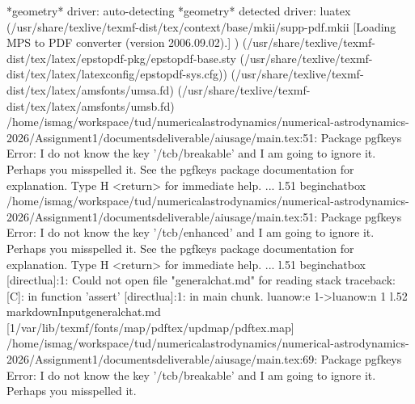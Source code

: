 {{*geometry* driver: auto-detecting
*geometry* detected driver: luatex
(/usr/share/texlive/texmf-dist/tex/context/base/mkii/supp-pdf.mkii
[Loading MPS to PDF converter (version 2006.09.02).]
) (/usr/share/texlive/texmf-dist/tex/latex/epstopdf-pkg/epstopdf-base.sty (/usr/share/texlive/texmf-dist/tex/latex/latexconfig/epstopdf-sys.cfg)) (/usr/share/texlive/texmf-dist/tex/latex/amsfonts/umsa.fd) (/usr/share/texlive/texmf-dist/tex/latex/amsfonts/umsb.fd)
/home/ismag/workspace/tud/numerical\markdownRendererUnderscore{}astrodynamics/numerical-astrodynamics-2026/Assignment1/documents\markdownRendererUnderscore{}deliverable/ai\markdownRendererUnderscore{}usage/main.tex:51: Package pgfkeys Error: I do not know the key '/tcb/breakable' and I am going to ignore it. Perhaps you misspelled it.
See the pgfkeys package documentation for explanation.
Type \markdownRendererNbsp{}H <return> \markdownRendererNbsp{}for immediate help.
...
l.51 \markdownRendererBackslash{}begin\markdownRendererLeftBrace{}chatbox\markdownRendererRightBrace{}
/home/ismag/workspace/tud/numerical\markdownRendererUnderscore{}astrodynamics/numerical-astrodynamics-2026/Assignment1/documents\markdownRendererUnderscore{}deliverable/ai\markdownRendererUnderscore{}usage/main.tex:51: Package pgfkeys Error: I do not know the key '/tcb/enhanced' and I am going to ignore it. Perhaps you misspelled it.
See the pgfkeys package documentation for explanation.
Type \markdownRendererNbsp{}H <return> \markdownRendererNbsp{}for immediate help.
...
l.51 \markdownRendererBackslash{}begin\markdownRendererLeftBrace{}chatbox\markdownRendererRightBrace{}
[\markdownRendererBackslash{}directlua]:1: Could not open file "general\markdownRendererUnderscore{}chat.md" for reading
stack traceback:
[C]: in function 'assert'
[\markdownRendererBackslash{}directlua]:1: in main chunk.
\markdownRendererBackslash{}lua\markdownRendererUnderscore{}now:e \markdownRendererHash{}1->\markdownRendererBackslash{}\markdownRendererUnderscore{}\markdownRendererUnderscore{}lua\markdownRendererUnderscore{}now:n \markdownRendererLeftBrace{}\markdownRendererHash{}1\markdownRendererRightBrace{}
l.52 \markdownRendererNbsp{} \markdownRendererNbsp{} \markdownRendererBackslash{}markdownInput\markdownRendererLeftBrace{}general\markdownRendererUnderscore{}chat.md\markdownRendererRightBrace{}
[1\markdownRendererLeftBrace{}/var/lib/texmf/fonts/map/pdftex/updmap/pdftex.map\markdownRendererRightBrace{}]
/home/ismag/workspace/tud/numerical\markdownRendererUnderscore{}astrodynamics/numerical-astrodynamics-2026/Assignment1/documents\markdownRendererUnderscore{}deliverable/ai\markdownRendererUnderscore{}usage/main.tex:69: Package pgfkeys Error: I do not know the key '/tcb/breakable' and I am going to ignore it. Perhaps you misspelled it.
}}
